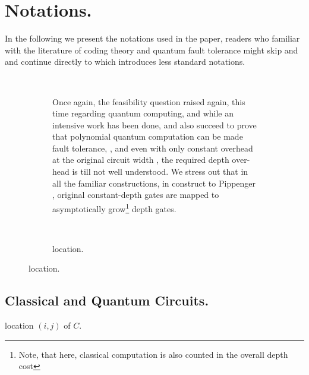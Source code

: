 \documentclass[manuscript,screen,review]{acmart}
\begin{document}
{  \section{ Notations. } In the following we present the notations used in the paper, readers who familiar with the literature of coding theory and quantum fault tolerance might skip  and  and continue directly to  which introduces less standard notations. 



  \begin{figure}[h]
\begin{subfigure}[h]{0.05\textwidth}
      \
    \end{subfigure}
    \begin{subfigure}[h]{0.45\textwidth}

  Once again, the feasibility question raised again, this time regarding quantum computing, and while an intensive work has been done, and also succeed to prove that polynomial quantum computation can be made fault tolerance, \cite{aharonov1999faulttolerant},\cite{gottesman2014faulttolerant} and even with only constant overhead at the original circuit width \cite{grospellier:tel-03364419}, the required depth over-head is till not well understood. We stress out that in all the familiar constructions, in construct to Pippenger \cite{Pippenger}, original constant-depth gates are mapped to asymptotically grow\footnote{Note, that here, classical computation is also counted in the overall depth cost} depth gates. 
    \end{subfigure}
    \begin{subfigure}[h]{0.05\textwidth}
      \
    \end{subfigure}
    \begin{subfigure}[h]{0.30\textwidth} 

    \caption{location.}
    \label{fig:location}
    \end{subfigure} 
  \end{figure}

  \subsection{Classical and Quantum Circuits.} 
  \begin{definition}
    location $(i,j)$ of $C$. 
  \end{definition}

}
\end{document}
